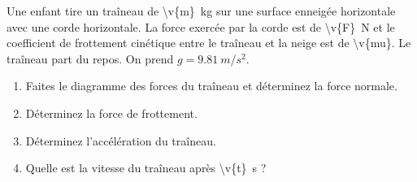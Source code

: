 Une enfant tire un traîneau de \qty{\v{m}}{kg} sur une surface enneigée horizontale avec une corde horizontale. La force exercée par la corde est de \qty{\v{F}}{N} et le coefficient de frottement cinétique entre le traîneau et la neige est de \num{\v{mu}}. Le traîneau part du repos. On prend $g = \qty{9.81}{m/s^2}$.

\begin{enumerate}[label=\alph*)]
    \item Faites le diagramme des forces du traîneau et déterminez la force normale.
    \item Déterminez la force de frottement.
    \item Déterminez l'accélération du traîneau.
    \item Quelle est la vitesse du traîneau après \qty{\v{t}}{s} ?
\end{enumerate}
